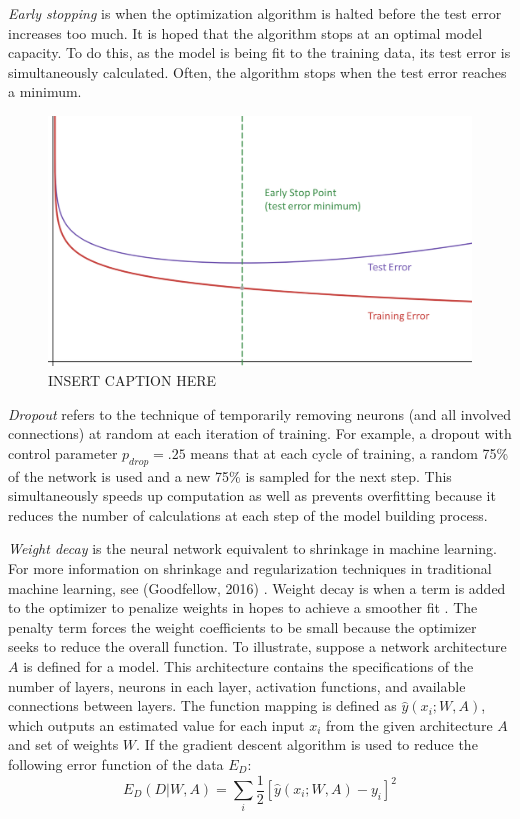 \textit{Early stopping} is when the optimization algorithm is halted before the test error increases too much.  It is hoped that the algorithm stops at an optimal model capacity. To do this, as the model is being fit to the training data, its test error is simultaneously calculated. 
 Often, the algorithm stops when the test error reaches a minimum. \cite{doan2004generalization}

 \begin{figure}[H]
    \centering
    \vspace{-0pt}
    \includegraphics[width=0.5\linewidth]{Figures/early_stop.png}
    \caption{\footnotesize INSERT CAPTION HERE}
    \label{earlystop}
\end{figure}

\textit{Dropout} refers to the technique of temporarily removing neurons (and all involved connections) at random  at each iteration of training.\cite{srivastava2014dropout}  For example, a dropout with control parameter $p_{drop} = .25$ means that at each cycle of training, a random 75\% of the network is used and a new 75\% is sampled for the next step. This simultaneously speeds up computation as well as prevents overfitting because it reduces the number of calculations at each step of the model building process.

\textit{Weight decay} is the neural network equivalent to shrinkage in machine learning.  For more information on shrinkage and regularization techniques in traditional machine learning, see (Goodfellow, 2016) \cite{Goodfellow-et-al-2016}.
Weight decay is when a  term is added to the optimizer to penalize weights in hopes to achieve a smoother fit \cite{mackay1992practical}.  The penalty term forces the weight coefficients to be small because the optimizer seeks to reduce the overall function.  To illustrate, suppose a network architecture $A$ is defined for a model.  This architecture contains the specifications of the number of layers, neurons in each layer, activation functions, and available connections between layers.  The function mapping is defined as $\hat{y}(x_i;W,A)$, which outputs an estimated value for each input $x_i$ from the given architecture $A$ and set of weights $W$.  If the gradient descent algorithm is used to reduce the following error function of the data $E_D$:
$$
E_D(D|W,A) = \sum_i \frac{1}{2} [\hat{y}(x_i;W,A) - y_i]^2
$$

